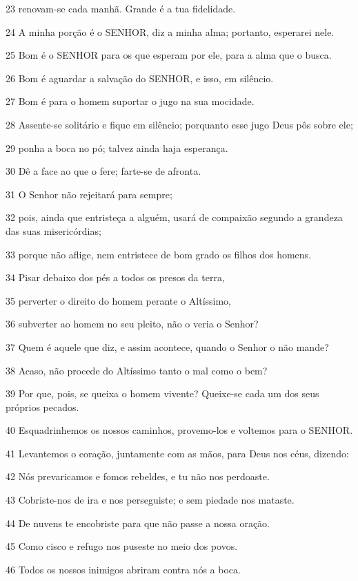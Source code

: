 \par 23 renovam-se cada manhã. Grande é a tua fidelidade.
\par 24 A minha porção é o SENHOR, diz a minha alma; portanto, esperarei nele.
\par 25 Bom é o SENHOR para os que esperam por ele, para a alma que o busca.
\par 26 Bom é aguardar a salvação do SENHOR, e isso, em silêncio.
\par 27 Bom é para o homem suportar o jugo na sua mocidade.
\par 28 Assente-se solitário e fique em silêncio; porquanto esse jugo Deus pôs sobre ele;
\par 29 ponha a boca no pó; talvez ainda haja esperança.
\par 30 Dê a face ao que o fere; farte-se de afronta.
\par 31 O Senhor não rejeitará para sempre;
\par 32 pois, ainda que entristeça a alguém, usará de compaixão segundo a grandeza das suas misericórdias;
\par 33 porque não aflige, nem entristece de bom grado os filhos dos homens.
\par 34 Pisar debaixo dos pés a todos os presos da terra,
\par 35 perverter o direito do homem perante o Altíssimo,
\par 36 subverter ao homem no seu pleito, não o veria o Senhor?
\par 37 Quem é aquele que diz, e assim acontece, quando o Senhor o não mande?
\par 38 Acaso, não procede do Altíssimo tanto o mal como o bem?
\par 39 Por que, pois, se queixa o homem vivente? Queixe-se cada um dos seus próprios pecados.
\par 40 Esquadrinhemos os nossos caminhos, provemo-los e voltemos para o SENHOR.
\par 41 Levantemos o coração, juntamente com as mãos, para Deus nos céus, dizendo:
\par 42 Nós prevaricamos e fomos rebeldes, e tu não nos perdoaste.
\par 43 Cobriste-nos de ira e nos perseguiste; e sem piedade nos mataste.
\par 44 De nuvens te encobriste para que não passe a nossa oração.
\par 45 Como cisco e refugo nos puseste no meio dos povos.
\par 46 Todos os nossos inimigos abriram contra nós a boca.
